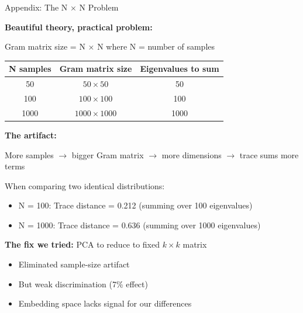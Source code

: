 \documentclass[aspectratio=169,11pt]{beamer}
\newcommand{\good}{\textcolor{darkgreen}{\ding{51}}}
\newcommand{\bad}{\textcolor{darkred}{\ding{55}}}
\begin{document}
\begin{frame}{Appendix: The N $\times$ N Problem}

\textbf{Beautiful theory, practical problem:}

\vspace{0.5em}

Gram matrix size = N $\times$ N where N = number of samples

\vspace{0.3em}

\begin{center}
\begin{tabular}{ccc}
\toprule
\textbf{N samples} & \textbf{Gram matrix size} & \textbf{Eigenvalues to sum} \\
\midrule
50 & $50 \times 50$ & 50 \\
100 & $100 \times 100$ & 100 \\
1000 & $1000 \times 1000$ & 1000 \\
\bottomrule
\end{tabular}
\end{center}

\vspace{0.5em}

\textbf{The artifact:}

More samples $\to$ bigger Gram matrix $\to$ more dimensions $\to$ trace sums more terms

\vspace{0.3em}

When comparing two identical distributions:
\begin{itemize}
  \item N = 100: Trace distance = 0.212 (summing over 100 eigenvalues)
  \item N = 1000: Trace distance = 0.636 (summing over 1000 eigenvalues)
\end{itemize}

\vspace{0.5em}

\textbf{The fix we tried:} PCA to reduce to fixed $k \times k$ matrix
\begin{itemize}
  \item Eliminated sample-size artifact \good
  \item But weak discrimination (7\% effect) \bad
  \item Embedding space lacks signal for our differences
\end{itemize}

\end{frame}
\end{document}
